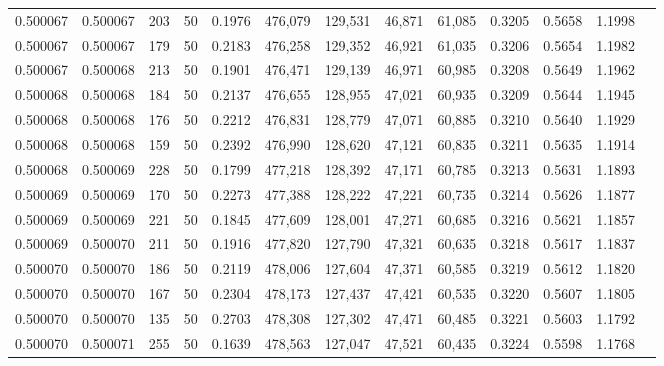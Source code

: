 \begin{tabular}{rrrrrrrrrrrrr}
0.500067 & 0.500067 &   203 &  50 &                                     0.1976 & 476,079 & 129,531 &  46,871 &  61,085 & 0.3205 & 0.5658 & 1.1998 \\
0.500067 & 0.500067 &   179 &  50 &                                     0.2183 & 476,258 & 129,352 &  46,921 &  61,035 & 0.3206 & 0.5654 & 1.1982 \\
0.500067 & 0.500068 &   213 &  50 &                                     0.1901 & 476,471 & 129,139 &  46,971 &  60,985 & 0.3208 & 0.5649 & 1.1962 \\
0.500068 & 0.500068 &   184 &  50 &                                     0.2137 & 476,655 & 128,955 &  47,021 &  60,935 & 0.3209 & 0.5644 & 1.1945 \\
0.500068 & 0.500068 &   176 &  50 &                                     0.2212 & 476,831 & 128,779 &  47,071 &  60,885 & 0.3210 & 0.5640 & 1.1929 \\
0.500068 & 0.500068 &   159 &  50 &                                     0.2392 & 476,990 & 128,620 &  47,121 &  60,835 & 0.3211 & 0.5635 & 1.1914 \\
0.500068 & 0.500069 &   228 &  50 &                                     0.1799 & 477,218 & 128,392 &  47,171 &  60,785 & 0.3213 & 0.5631 & 1.1893 \\
0.500069 & 0.500069 &   170 &  50 &                                     0.2273 & 477,388 & 128,222 &  47,221 &  60,735 & 0.3214 & 0.5626 & 1.1877 \\
0.500069 & 0.500069 &   221 &  50 &                                     0.1845 & 477,609 & 128,001 &  47,271 &  60,685 & 0.3216 & 0.5621 & 1.1857 \\
0.500069 & 0.500070 &   211 &  50 &                                     0.1916 & 477,820 & 127,790 &  47,321 &  60,635 & 0.3218 & 0.5617 & 1.1837 \\
0.500070 & 0.500070 &   186 &  50 &                                     0.2119 & 478,006 & 127,604 &  47,371 &  60,585 & 0.3219 & 0.5612 & 1.1820 \\
0.500070 & 0.500070 &   167 &  50 &                                     0.2304 & 478,173 & 127,437 &  47,421 &  60,535 & 0.3220 & 0.5607 & 1.1805 \\
0.500070 & 0.500070 &   135 &  50 &                                     0.2703 & 478,308 & 127,302 &  47,471 &  60,485 & 0.3221 & 0.5603 & 1.1792 \\
0.500070 & 0.500071 &   255 &  50 &                                     0.1639 & 478,563 & 127,047 &  47,521 &  60,435 & 0.3224 & 0.5598 & 1.1768 \\

\end{tabular}
